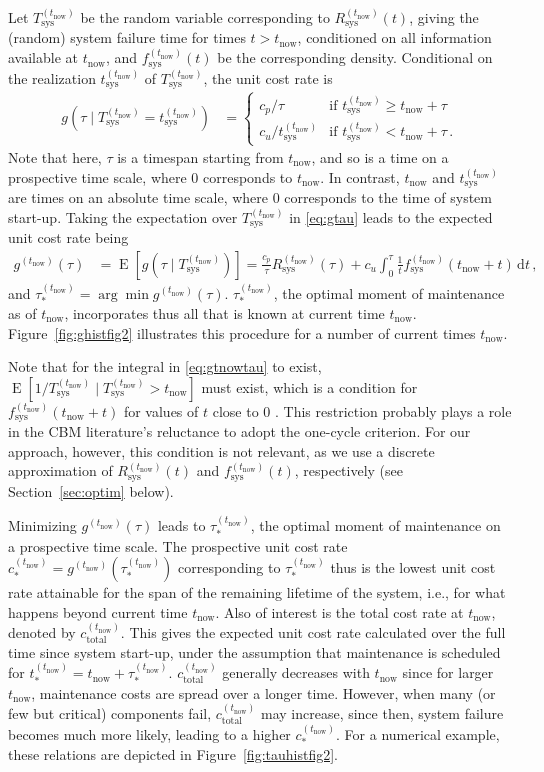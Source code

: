 \documentclass[authoryear]{elsarticle}
\newcommand{\dd}{\,\mathrm{d}}
\newcommand{\E}{\operatorname{E}}
\def\tnow{t_\text{now}}
\newcommand{\Rsysnow}{R^{(t_\text{now})}_\text{sys}}
\newcommand{\Tsysnow}{T^{(t_\text{now})}_\text{sys}}
\newcommand{\tsysnow}{t^{(t_\text{now})}_\text{sys}}
\newcommand{\fsysnow}{f^{(t_\text{now})}_\text{sys}}
\newcommand{\gnow}{g^{(\tnow)}}
\newcommand{\tausnow}{\tau_*^{(\tnow)}}
\newcommand{\tstarnow}{t_*^{(\tnow)}}
\newcommand{\cstarnow}{c_*^{(\tnow)}}
\newcommand{\ctotalnow}{c_\text{total}^{(\tnow)}}
\begin{document}
Let $\Tsysnow$ be the random variable corresponding to $\Rsysnow(t)$,
giving the (random) system failure time for times $t > \tnow$,
conditioned on all information available at $\tnow$,
and $\fsysnow(t)$ be the corresponding density.
Conditional on the realization $\tsysnow$ of $\Tsysnow$, the unit cost rate is 
\begin{align}
g(\tau \mid \Tsysnow = \tsysnow) &=
\begin{cases}
c_p / \tau     & \text{if } \tsysnow \ge \tnow + \tau \\
c_u / \tsysnow & \text{if } \tsysnow  <  \tnow + \tau \,.
\end{cases}
\label{eq:gtau}
\end{align}
Note that here, $\tau$ is a timespan starting from $\tnow$,
and so is a time on a prospective time scale, where $0$ corresponds to $\tnow$.
In contrast, $\tnow$ and $\tsysnow$ are times on an absolute time scale,
where $0$ corresponds to the time of system start-up.
Taking the expectation over $\Tsysnow$ in \eqref{eq:gtau} leads to the expected unit cost rate being
\begin{align}
\gnow(\tau) &= \E[g(\tau \mid \Tsysnow)] = \frac{c_p}{\tau} \Rsysnow(\tau) + c_u \int_0^\tau \frac{1}{t} \fsysnow(\tnow + t) \dd t\,,
\label{eq:gtnowtau}
\end{align}
and $\tausnow = \arg\min \gnow(\tau)$.
$\tausnow$, the optimal moment of maintenance as of $\tnow$,
incorporates thus all that is known at current time $\tnow$.
Figure~\ref{fig:ghistfig2} illustrates this procedure for a number of current times $\tnow$.

Note that for the integral in \eqref{eq:gtnowtau} to exist, $\E[1/\Tsysnow \mid \Tsysnow > \tnow]$ must exist,
which is a condition for $\fsysnow(\tnow + t)$ for values of $t$ close to $0$ \citep{2006:coolen-schrijner-coolen}.
This restriction probably plays a role in the CBM literature's reluctance to adopt the one-cycle criterion.
For our approach, however, this condition is not relevant,
as we use a discrete approximation of $\Rsysnow(t)$ and $\fsysnow(t)$, respectively
(see Section~\ref{sec:optim} below).

Minimizing $\gnow(\tau)$ leads to $\tausnow$,
the optimal moment of maintenance on a prospective time scale.
The prospective unit cost rate $\cstarnow = \gnow(\tausnow)$ corresponding to $\tausnow$
thus is the lowest unit cost rate attainable for the span of the remaining lifetime of the system,
i.e., for what happens beyond current time $\tnow$.
Also of interest is the total cost rate at $\tnow$, denoted by $\ctotalnow$.
This gives the expected unit cost rate calculated over the full time since system start-up,
under the assumption that maintenance is scheduled for $\tstarnow = \tnow + \tausnow$.
$\ctotalnow$ generally decreases with $\tnow$ since for larger $\tnow$, maintenance costs are spread over a longer time.
However, when many (or few but critical) components fail, $\ctotalnow$ may increase,
since then, system failure becomes much more likely, leading to a higher $\cstarnow$.
For a numerical example, these relations are depicted in Figure~\ref{fig:tauhistfig2}.
\end{document}
